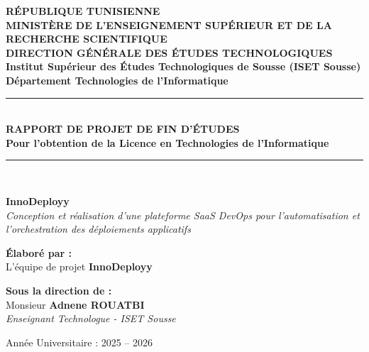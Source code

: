 \documentclass[12pt,a4paper,oneside]{report}
\begin{document}
\begin{titlepage}
    \centering
    {\large \textbf{RÉPUBLIQUE TUNISIENNE}}\\[0.2cm]
    {\large \textbf{MINISTÈRE DE L'ENSEIGNEMENT SUPÉRIEUR ET DE LA RECHERCHE SCIENTIFIQUE}}\\[0.2cm]
    {\large \textbf{DIRECTION GÉNÉRALE DES ÉTUDES TECHNOLOGIQUES}}\\[0.3cm]
    \textbf{Institut Supérieur des Études Technologiques de Sousse (ISET Sousse)}\\[0.2cm]
    \textbf{Département Technologies de l'Informatique}\\[1.5cm]

    \rule{\linewidth}{0.6mm}\\[0.4cm]
    {\huge \bfseries \textcolor{primary}{RAPPORT DE PROJET DE FIN D'ÉTUDES}}\\[0.3cm]
    {\Large \textbf{Pour l'obtention de la Licence en Technologies de l'Informatique}}\\[0.2cm]
    \rule{\linewidth}{0.6mm}\\[1.5cm]

    \begin{tcolorbox}[colback=lightgray,colframe=primary,arc=3mm,boxrule=1.5pt]
        \centering\vspace{0.3cm}
        {\LARGE \bfseries InnoDeployy}\\[0.3cm]
        {\large \textit{Conception et réalisation d'une plateforme SaaS DevOps pour l'automatisation et l'orchestration des déploiements applicatifs}}\\[0.3cm]
    \end{tcolorbox}

    \vfill

    \begin{minipage}{0.48\textwidth}
        \textbf{Élaboré par :}\\
        L'équipe de projet \textbf{InnoDeployy}
    \end{minipage}
    \hfill
    \begin{minipage}{0.48\textwidth}
        \begin{flushright}
            \textbf{Sous la direction de :}\\
            Monsieur \textbf{Adnene ROUATBI}\\
            \textit{Enseignant Technologue - ISET Sousse}
        \end{flushright}
    \end{minipage}

    \vfill
    {\large Année Universitaire : 2025 -- 2026}
\end{titlepage}
\end{document}
